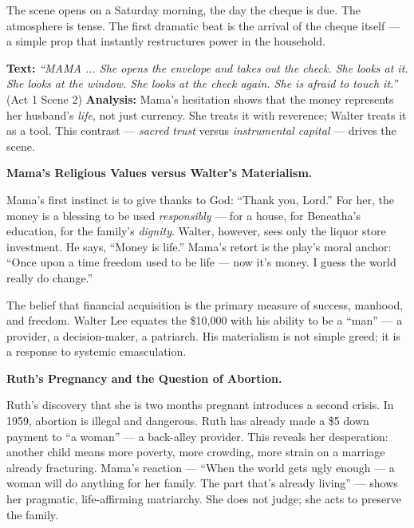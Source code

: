 \documentclass[11pt]{article}
\begin{document}
The scene opens on a Saturday morning, the day the cheque is due. The atmosphere is tense. The first dramatic beat is the arrival of the cheque itself — a simple prop that instantly restructures power in the household.

\begin{exemplebox}
\textbf{Text:} \emph{``MAMA ... She opens the envelope and takes out the check. She looks at it. She looks at the window. She looks at the check again. She is afraid to touch it.''} (Act 1 Scene 2)
\textbf{Analysis:} Mama's hesitation shows that the money represents her husband's \emph{life}, not just currency. She treats it with reverence; Walter treats it as a tool. This contrast — \emph{sacred trust} versus \emph{instrumental capital} — drives the scene.
\end{exemplebox}

\textbf{Mama's Religious Values versus Walter's Materialism.}\par
Mama's first instinct is to give thanks to God: ``Thank you, Lord.'' For her, the money is a blessing to be used \emph{responsibly} — for a house, for Beneatha's education, for the family's \emph{dignity}. Walter, however, sees only the liquor store investment. He says, ``Money is life.'' Mama's retort is the play's moral anchor: ``Once upon a time freedom used to be life — now it's money. I guess the world really do change.''

\begin{definition}
The belief that financial acquisition is the primary measure of success, manhood, and freedom. Walter Lee equates the \$10,000 with his ability to be a ``man'' — a provider, a decision-maker, a patriarch. His materialism is not simple greed; it is a response to systemic emasculation.
\end{definition}

\textbf{Ruth's Pregnancy and the Question of Abortion.}\par
Ruth's discovery that she is two months pregnant introduces a second crisis. In 1959, abortion is illegal and dangerous. Ruth has already made a \$5 down payment to ``a woman'' — a back-alley provider. This reveals her desperation: another child means more poverty, more crowding, more strain on a marriage already fracturing. Mama's reaction — ``When the world gets ugly enough — a woman will do anything for her family. The part that's already living'' — shows her pragmatic, life-affirming matriarchy. She does not judge; she acts to preserve the family.
\end{document}
